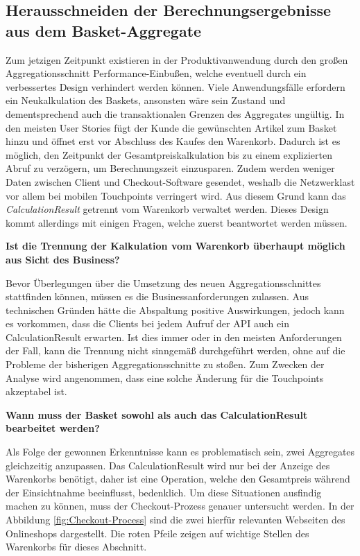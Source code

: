 \subsection{Herausschneiden der Berechnungsergebnisse aus dem Basket-Aggregate}

Zum jetzigen Zeitpunkt existieren in der Produktivanwendung durch den großen Aggregationsschnitt Performance-Einbußen, welche eventuell durch ein verbessertes Design verhindert werden können. Viele Anwendungsfälle erfordern ein Neukalkulation des Baskets, ansonsten wäre sein Zustand und dementsprechend auch die transaktionalen Grenzen des Aggregates ungültig. In den meisten User Stories fügt der Kunde die gewünschten Artikel zum Basket hinzu und öffnet erst vor Abschluss des Kaufes den Warenkorb. Dadurch ist es möglich, den Zeitpunkt der Gesamtpreiskalkulation bis zu einem explizierten Abruf zu verzögern, um Berechnungszeit einzusparen. Zudem werden weniger Daten zwischen Client und Checkout-Software gesendet, weshalb die Netzwerklast vor allem bei mobilen Touchpoints verringert wird. Aus diesem Grund kann das \emph{CalculationResult} getrennt vom Warenkorb verwaltet werden. Dieses Design kommt allerdings mit einigen Fragen, welche zuerst beantwortet werden müssen.

\textbf{Ist die Trennung der Kalkulation vom Warenkorb überhaupt möglich aus Sicht des Business?}

Bevor Überlegungen über die Umsetzung des neuen Aggregationsschnittes stattfinden können, müssen es die Businessanforderungen zulassen. Aus technischen Gründen hätte die Abspaltung positive Auswirkungen, jedoch kann es vorkommen, dass die Clients bei jedem Aufruf der API auch ein CalculationResult erwarten. Ist dies immer oder in den meisten Anforderungen der Fall, kann die Trennung nicht sinngemäß durchgeführt werden, ohne auf die Probleme der bisherigen Aggregationsschnitte zu stoßen. Zum Zwecken der Analyse wird angenommen, dass eine solche Änderung für die Touchpoints akzeptabel ist.

\textbf{Wann muss der Basket sowohl als auch das CalculationResult bearbeitet werden?}

Als Folge der gewonnen Erkenntnisse kann es problematisch sein, zwei Aggregates gleichzeitig anzupassen. Das CalculationResult wird nur bei der Anzeige des Warenkorbs benötigt, daher ist eine Operation, welche den Gesamtpreis während der Einsichtnahme beeinflusst, bedenklich. Um diese Situationen ausfindig machen zu können, muss der Checkout-Prozess genauer untersucht werden. In der Abbildung \ref{fig:Checkout-Process} sind die zwei hierfür relevanten Webseiten des Onlineshops dargestellt. Die roten Pfeile zeigen auf wichtige Stellen des Warenkorbs für dieses Abschnitt.

